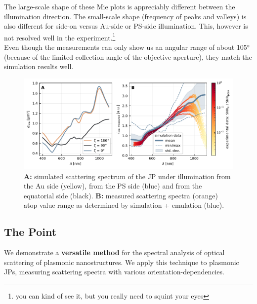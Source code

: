 \documentclass[10pt]{article}
\begin{document}
The large-scale shape of these Mie plots is appreciably different between the illumination direction. 
The small-scale shape (frequency of peaks and valleys) is also different for side-on versus Au-side or PS-side illumination. This, however is not resolved well in the experiment.\footnote{you can kind of see it, but you really need to squint your eyes}  \\

Even though the measurements can only show us an angular range of about 105° (because of the limited collection angle of the objective aperture), they match the simulation results well.\\


\begin{figure}[h!]
    \centering
    \includegraphics{[fig] spectra.PDF}
    \caption{{\sffamily\bfseries A:} simulated scattering spectrum of the JP under illumination from the Au side (yellow), from the PS side (blue) and from the equatorial side (black). {\sffamily\bfseries B:} measured scattering spectra (orange) atop value range as determined by simulation + emulation (blue).}
    \label{fig:spectra}
\end{figure}




\subsection*{The Point}

We demonstrate a \textbf{versatile method} for the spectral analysis of optical scattering of plasmonic nanostructures. We apply this technique to plasmonic JPs, measuring scattering spectra with various orientation-dependencies. 
\end{document}
